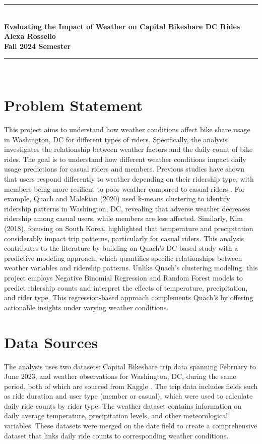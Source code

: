 \documentclass{article}
\begin{document}
\onehalfspacing %

\begin{center}
\rule{\linewidth}{1mm} \\[0.5cm]
{\Large\textbf{Evaluating the Impact of Weather on Capital Bikeshare DC Rides}}\\[0.3cm]
{\Large \textbf{Alexa Rossello}}\\[0.3cm]
{\Large \textbf{Fall 2024 Semester}}\\
\rule{\linewidth}{1mm} \\[0.2cm]
\end{center}

\section*{Problem Statement}
This project aims to understand how weather conditions affect bike share usage in Washington, DC for different types of riders. Specifically, the analysis investigates the relationship between weather factors and the daily count of bike rides. The goal is to understand how different weather conditions impact daily usage predictions for casual riders and members. Previous studies have shown that users respond differently to weather depending on their ridership type, with members being more resilient to poor weather compared to casual riders \cite{quach2020, kim2018}. For example, Quach and Malekian (2020) used k-means clustering to identify ridership patterns in Washington, DC, revealing that adverse weather decreases ridership among casual users, while members are less affected. Similarly, Kim (2018), focusing on South Korea, highlighted that temperature and precipitation considerably impact trip patterns, particularly for casual riders. This analysis contributes to the literature by building on Quach’s DC-based study with a predictive modeling approach, which quantifies specific relationships between weather variables and ridership patterns. Unlike Quach’s clustering modeling, this project employs Negative Binomial Regression and Random Forest models to predict ridership counts and interpret the effects of temperature, precipitation, and rider type. This regression-based approach complements Quach’s by offering actionable insights under varying weather conditions. 

\section*{Data Sources}
The analysis uses two datasets: Capital Bikeshare trip data spanning February to June 2023, and weather observations for Washington, DC, during the same period, both of which are sourced from Kaggle \cite{kaggle2023}. The trip data includes fields such as ride duration and user type (member or casual), which were used to calculate daily ride counts by rider type. The weather dataset contains information on daily average temperature, precipitation levels, and other meteorological variables. These datasets were merged on the date field to create a comprehensive dataset that links daily ride counts to corresponding weather conditions.
\end{document}
